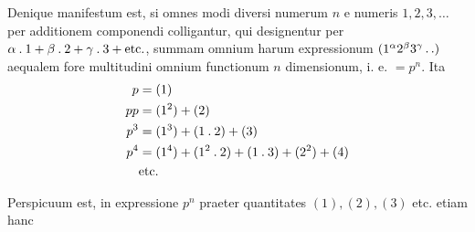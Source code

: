 Denique manifestum est, si omnes modi diversi numerum $n$ e numeris $1,2,3,\ldots$ per additionem componendi colligantur, qui designentur per $\alpha\mathbin{.}1+\beta\mathbin{.}2+\gamma\mathbin{.}3+\text{etc.}$, summam omnium harum expressionum $(1^\alpha2^\beta3^\gamma\mathinner{.\,.})$ aequalem fore multitudini omnium functionum $n$ dimensionum, i. e. $=p^n$. Ita
\[
\begin{aligned}
p&=(1)\\
pp&=(1^2)+(2)\\
p^3&=(1^3)+(1\mathbin{.}2)+(3)\\
p^4&=(1^4)+(1^2\mathbin{.}2)+(1\mathbin{.}3)+(2^2)+(4)\\
&\text{etc.}
\end{aligned}
\]

Perspicuum est, in expressione $p^n$ praeter quantitates $(1),(2),(3)$ etc. etiam hanc
